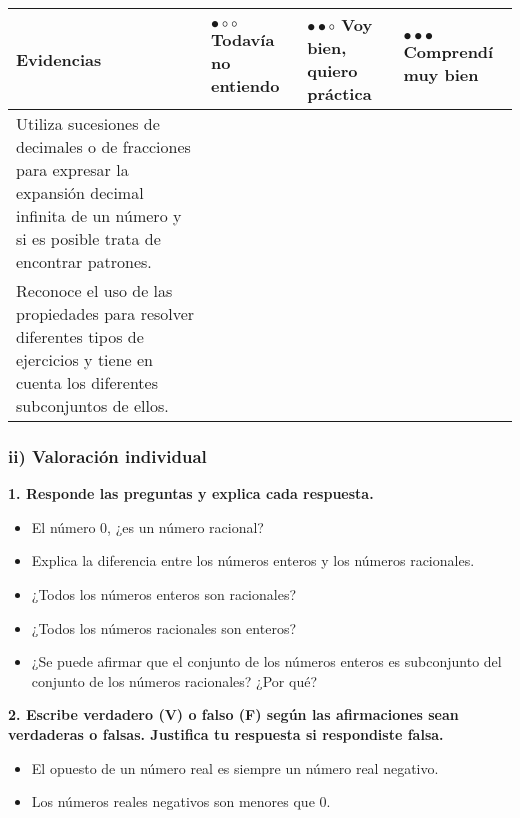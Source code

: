 \documentclass[12pt,a4paper]{article}
\begin{document}
\begin{center}
\small
\begin{tabular}{|p{}|p{}|p{}|p{}|}
\hline
\textbf{Evidencias} & \textbf{$\bullet\circ\circ$} Todavía no entiendo & \textbf{$\bullet\bullet\circ$} Voy bien, quiero práctica & \textbf{$\bullet\bullet\bullet$} Comprendí muy bien \\
\hline
Utiliza sucesiones de decimales o de fracciones para expresar la expansión decimal infinita de un número y si es posible trata de encontrar patrones. & & & \\[0.8cm]
\hline
Reconoce el uso de las propiedades para resolver diferentes tipos de ejercicios y tiene en cuenta los diferentes subconjuntos de ellos. & & & \\[0.8cm]
\hline
\end{tabular}
\normalsize
\end{center}

\vspace{1cm}

\subsubsection*{ii) Valoración individual}

\textbf{1. Responde las preguntas y explica cada respuesta.}

\begin{itemize}
\item El número 0, ¿es un número racional?
\item Explica la diferencia entre los números enteros y los números racionales.
\item ¿Todos los números enteros son racionales?
\item ¿Todos los números racionales son enteros?
\item ¿Se puede afirmar que el conjunto de los números enteros es subconjunto del conjunto de los números racionales? ¿Por qué?
\end{itemize}

\vspace{0.5cm}

\textbf{2. Escribe verdadero (V) o falso (F) según las afirmaciones sean verdaderas o falsas. Justifica tu respuesta si respondiste falsa.}

\begin{itemize}
\item El opuesto de un número real es siempre un número real negativo.
\item Los números reales negativos son menores que 0.
\end{itemize}
\end{document}
